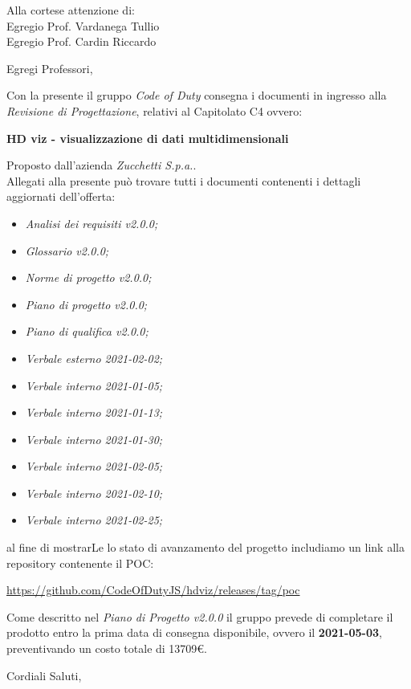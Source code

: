 \documentclass[11pt]{letter}
\begin{document}
\begin{letter}{Alla cortese attenzione di: \\ Egregio Prof. Vardanega Tullio \\ Egregio Prof. Cardin Riccardo}
\date{10 Marzo, 2021}
\opening{Egregi Professori,}
Con la presente il gruppo \textit{Code of Duty} consegna i documenti in ingresso alla \textit{Revisione di Progettazione}, relativi al Capitolato C4 ovvero:
\begin{center}
    \textbf{HD viz -  visualizzazione di dati multidimensionali}
\end{center}
Proposto dall'azienda \textit{Zucchetti S.p.a.}.\\
Allegati alla presente può trovare tutti i documenti contenenti i dettagli aggiornati dell'offerta:
\begin{itemize}
    \item \textit{Analisi dei requisiti v2.0.0;}
    \item \textit{Glossario v2.0.0;}
    \item \textit{Norme di progetto v2.0.0;}
    \item \textit{Piano di progetto v2.0.0;}
    \item \textit{Piano di qualifica v2.0.0;}
    \item \textit{Verbale esterno 2021-02-02;}
    \item \textit{Verbale interno 2021-01-05;}
    \item \textit{Verbale interno 2021-01-13;}
    \item \textit{Verbale interno 2021-01-30;}
    \item \textit{Verbale interno 2021-02-05;}
    \item \textit{Verbale interno 2021-02-10;}
    \item \textit{Verbale interno 2021-02-25;}
\end{itemize}
al fine di mostrarLe lo stato di avanzamento del progetto includiamo un link alla repository contenente il POC:
\begin{center}
\url{https://github.com/CodeOfDutyJS/hdviz/releases/tag/poc}
\end{center}
Come descritto nel \textit{Piano di Progetto v2.0.0} il gruppo prevede di completare il prodotto entro la prima data di consegna disponibile, ovvero il \textbf{2021-05-03}, preventivando un costo totale di 13709€.
\closing{Cordiali Saluti,}
\end{letter}
\end{document}
